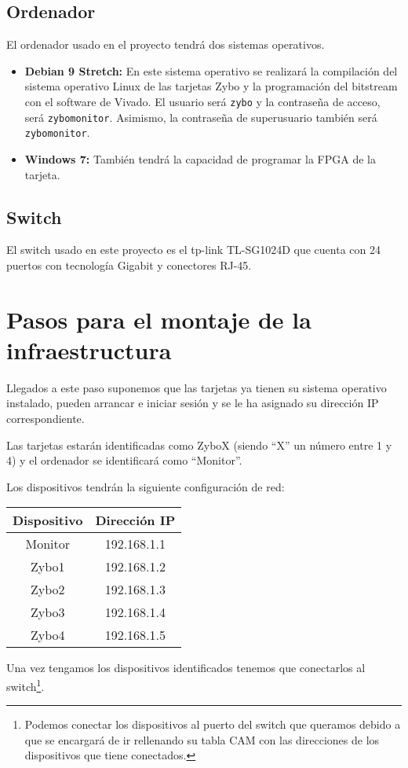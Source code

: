 \documentclass[12pt,letterpaper]{article}
\begin{document}
%

\newpage

\subsection{Ordenador}
El ordenador usado en el proyecto tendrá dos sistemas operativos.
\begin{itemize}
	\item \textbf{Debian 9 Stretch:} En este sistema operativo se realizará la compilación del sistema operativo Linux de las tarjetas Zybo y la programación del bitstream con el software de Vivado. El usuario será \texttt{zybo} y la contraseña de acceso, será \texttt{zybomonitor}. Asimismo, la contraseña de superusuario también será \texttt{zybomonitor}.
	\item \textbf{Windows 7:} También tendrá la capacidad de programar la FPGA de la tarjeta.
\end{itemize}

\subsection{Switch}
El switch usado en este proyecto es el tp-link TL-SG1024D que cuenta con 24 puertos con tecnología Gigabit y conectores RJ-45.


\section{Pasos para el montaje de la infraestructura}
Llegados a este paso suponemos que las tarjetas ya tienen su sistema operativo instalado, pueden arrancar e iniciar sesión y se le ha asignado su dirección IP correspondiente.

Las tarjetas estarán identificadas como ZyboX (siendo ``X'' un número entre 1 y 4) y el ordenador se identificará como ``Monitor''.

Los dispositivos tendrán la siguiente configuración de red:
\begin{table}[h]
	\centering
	\begin{tabular}{|c|c|}
		\hline
		\textbf{Dispositivo} & \textbf{Dirección IP} \\ \hline
		Monitor & 192.168.1.1 \\ \hline
		Zybo1 & 192.168.1.2 \\ \hline
		Zybo2 & 192.168.1.3 \\ \hline
		Zybo3 & 192.168.1.4 \\ \hline
		Zybo4 & 192.168.1.5 \\ \hline
	\end{tabular}
\end{table}

Una vez tengamos los dispositivos identificados tenemos que conectarlos al switch\footnote{Podemos conectar los dispositivos al puerto del switch que queramos debido a que se encargará de ir rellenando su tabla CAM con las direcciones de los dispositivos que tiene conectados.}.
\end{document}
